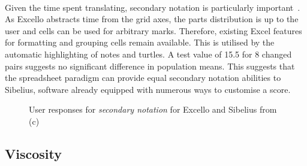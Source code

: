 \paragraph{} Given the time spent translating, secondary notation is particularly important~\cite{blackwell:notation}. As Excello abstracts time from the grid axes, the parts distribution is up to the user and cells can be used for arbitrary marks. Therefore, existing Excel features for formatting and grouping cells remain available. This is utilised by the automatic highlighting of notes and turtles. A test value of 15.5 for 8 changed pairs suggests no significant difference in population means. This suggests that the spreadsheet paradigm can provide equal secondary notation abilities to Sibelius, software already equipped with numerous ways to customise a score.

\begin{figure}[tbh]
\caption{User responses for \textit{secondary notation} for Excello and Sibelius from (c)}
\label{evaluation:secn}
\end{figure}

\subsection{Viscosity}

